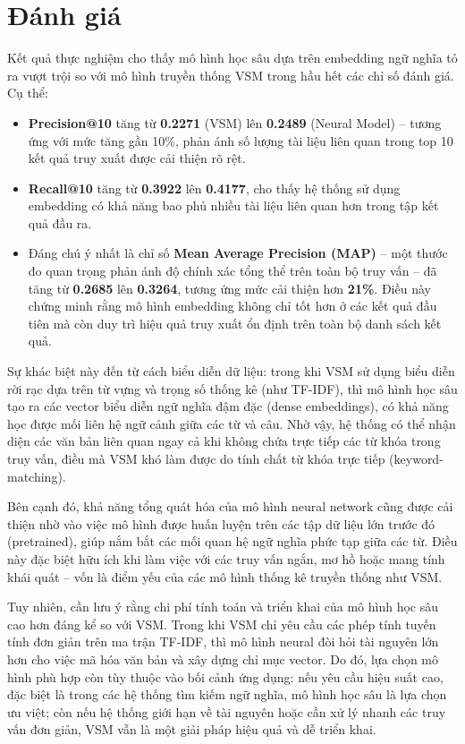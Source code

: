 \section{Đánh giá}
Kết quả thực nghiệm cho thấy mô hình học sâu dựa trên embedding ngữ nghĩa tỏ ra vượt trội so với mô hình truyền thống VSM trong hầu hết các chỉ số đánh giá. Cụ thể:

\begin{itemize}
\item \textbf{Precision@10} tăng từ \textbf{0.2271} (VSM) lên \textbf{0.2489} (Neural Model) -- tương ứng với mức tăng gần 10\%, phản ánh số lượng tài liệu liên quan trong top 10 kết quả truy xuất được cải thiện rõ rệt.
\item \textbf{Recall@10} tăng từ \textbf{0.3922} lên \textbf{0.4177}, cho thấy hệ thống sử dụng embedding có khả năng bao phủ nhiều tài liệu liên quan hơn trong tập kết quả đầu ra.

\item Đáng chú ý nhất là chỉ số \textbf{Mean Average Precision (MAP)} -- một thước đo quan trọng phản ánh độ chính xác tổng thể trên toàn bộ truy vấn -- đã tăng từ \textbf{0.2685} lên \textbf{0.3264}, tương ứng mức cải thiện hơn \textbf{21\%}. Điều này chứng minh rằng mô hình embedding không chỉ tốt hơn ở các kết quả đầu tiên mà còn duy trì hiệu quả truy xuất ổn định trên toàn bộ danh sách kết quả.
\end{itemize}

Sự khác biệt này đến từ cách biểu diễn dữ liệu: trong khi VSM sử dụng biểu diễn rời rạc dựa trên từ vựng và trọng số thống kê (như TF-IDF), thì mô hình học sâu tạo ra các vector biểu diễn ngữ nghĩa đậm đặc (dense embeddings), có khả năng học được mối liên hệ ngữ cảnh giữa các từ và câu. Nhờ vậy, hệ thống có thể nhận diện các văn bản liên quan ngay cả khi không chứa trực tiếp các từ khóa trong truy vấn, điều mà VSM khó làm được do tính chất từ khóa trực tiếp (keyword-matching).

Bên cạnh đó, khả năng tổng quát hóa của mô hình neural network cũng được cải thiện nhờ vào việc mô hình được huấn luyện trên các tập dữ liệu lớn trước đó (pretrained), giúp nắm bắt các mối quan hệ ngữ nghĩa phức tạp giữa các từ. Điều này đặc biệt hữu ích khi làm việc với các truy vấn ngắn, mơ hồ hoặc mang tính khái quát -- vốn là điểm yếu của các mô hình thống kê truyền thống như VSM.

Tuy nhiên, cần lưu ý rằng chi phí tính toán và triển khai của mô hình học sâu cao hơn đáng kể so với VSM. Trong khi VSM chỉ yêu cầu các phép tính tuyến tính đơn giản trên ma trận TF-IDF, thì mô hình neural đòi hỏi tài nguyên lớn hơn cho việc mã hóa văn bản và xây dựng chỉ mục vector. Do đó, lựa chọn mô hình phù hợp còn tùy thuộc vào bối cảnh ứng dụng: nếu yêu cầu hiệu suất cao, đặc biệt là trong các hệ thống tìm kiếm ngữ nghĩa, mô hình học sâu là lựa chọn ưu việt; còn nếu hệ thống giới hạn về tài nguyên hoặc cần xử lý nhanh các truy vấn đơn giản, VSM vẫn là một giải pháp hiệu quả và dễ triển khai.
